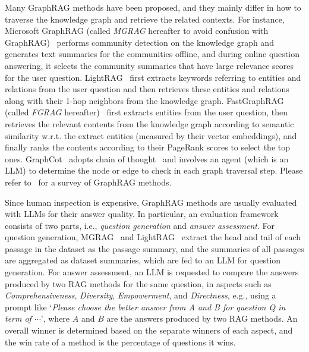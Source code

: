 Many GraphRAG methods have been proposed, and they mainly differ in how to traverse the knowledge graph and retrieve the related contexts. For instance, Microsoft GraphRAG (called \textit{MGRAG} hereafter to avoid confusion with GraphRAG)~\cite{edge2024local} performs community detection on the knowledge graph and generates text summaries for the communities offline, and during online question answering, it selects the community summaries that have large relevance scores for the user question. LightRAG~\cite{guo2024lightrag} first extracts keywords referring to entities and relations from the user question and then retrieves these entities and relations along with their 1-hop neighbors from the knowledge graph. FastGraphRAG (called \textit{FGRAG} hereafter)~\cite{fastgraphrag2024} first extracts entities from the user question, then retrieves the relevant contents from the knowledge graph according to semantic similarity w.r.t. the extract entities (measured by their vector embeddings), and finally ranks the contents according to their PageRank scores to select the top ones. GraphCot~\cite{jin2024graph} adopts chain of thought~\cite{wei2022chain} and involves an agent (which is an LLM) to determine the node or edge to check in each graph traversal step. Please refer to~\cite{procko2024graph,han2024retrieval} for a survey of GraphRAG methods. 


Since human inspection is expensive, GraphRAG methods are usually evaluated with LLMs for their answer quality. In particular, an evaluation framework consists of two parts, i.e., \textit{question generation} and  \textit{answer assessment}. For question generation,  MGRAG~\cite{edge2024local} and LightRAG~\cite{guo2024lightrag} extract the head and tail of each passage in the dataset as the passage summary, and the summaries of all passages are aggregated as dataset summaries, which are fed to an LLM for question generation.
For answer assessment, an LLM is requested to compare the answers produced by two RAG methods for the same question, in aspects such as \textit{Comprehensiveness}, \textit{Diversity}, \textit{Empowerment}, and \textit{Directness}, e.g., using a prompt like `\textit{Please choose the better answer from A and B for question Q in term of $\cdots$}', where $A$ and $B$ are the answers produced by two RAG methods. An overall winner is determined based on the separate winners of each aspect, and the win rate of a method is the percentage of questions it wins.

